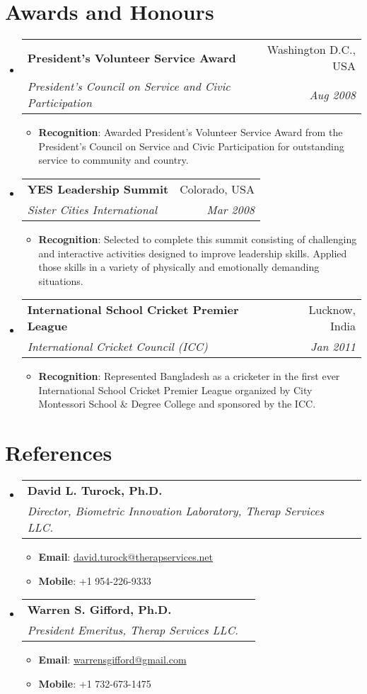 \documentclass[letterpaper,11pt]{article}
\makeatletter
\newcommand{\resumeItem}[2]{
  \item\small{
    \textbf{#1}{: #2 \vspace{-2pt}}
  }
}
\newcommand{\resumeSubheading}[4]{
  \vspace{-1pt}\item
    \begin{tabular*}{0.97\textwidth}[t]{l@{\extracolsep{\fill}}r}
      \textbf{#1} & #2 \\
      \textit{\small#3} & \textit{\small #4} \\
    \end{tabular*}\vspace{-5pt}
}
\newcommand{\resumeSubHeadingListStart}{\begin{itemize}[leftmargin=*]}
\newcommand{\resumeSubHeadingListEnd}{\end{itemize}}
\newcommand{\resumeItemListStart}{\begin{itemize}}
\newcommand{\resumeItemListEnd}{\end{itemize}\vspace{-5pt}}
\makeatother
\begin{document}
\section{Awards and Honours}
  \resumeSubHeadingListStart
	  \resumeSubheading
      {President's Volunteer Service Award}{Washington D.C., USA}
      {President's Council on Service and Civic Participation}{Aug 2008}
      \resumeItemListStart
      	\resumeItem{Recognition}{Awarded President's Volunteer Service Award from the President's Council on Service and Civic Participation for outstanding service to community and country.}
      \resumeItemListEnd 
    \resumeSubheading
      {YES Leadership Summit}{Colorado, USA}
      {Sister Cities International}{Mar 2008}
      \resumeItemListStart
      	\resumeItem{Recognition}{Selected to complete this summit consisting of challenging and interactive activities designed to improve leadership skills. Applied those skills in a variety of physically and emotionally demanding situations.}
      \resumeItemListEnd 
    \resumeSubheading
      {International School Cricket Premier League}{Lucknow, India}
      {International Cricket Council (ICC)}{Jan 2011 }
      \resumeItemListStart
      	\resumeItem{Recognition}{Represented Bangladesh as a cricketer in the first ever International School Cricket Premier League organized by City Montessori School \& Degree College and sponsored by the ICC.}
      \resumeItemListEnd 
  \resumeSubHeadingListEnd
  
\section{References}
  \resumeSubHeadingListStart
       \resumeSubheading
      {David L. Turock, Ph.D.}{}
      {Director, Biometric Innovation Laboratory, Therap Services LLC.}{}
      \resumeItemListStart
      	\resumeItem{Email}{ \href{mailto:david.turock@therapservices.net}{david.turock@therapservices.net}}
      	\resumeItem{Mobile}{+1 954-226-9333}
      \resumeItemListEnd
       \resumeSubheading
      {Warren S. Gifford, Ph.D.}{}
      {President Emeritus, Therap Services LLC.}{}
      \resumeItemListStart
      	\resumeItem{Email}{ \href{mailto:warrensgifford@gmail.com}{warrensgifford@gmail.com}}
      	\resumeItem{Mobile}{+1 732-673-1475}
      \resumeItemListEnd    
 \resumeSubHeadingListEnd
\end{document}

